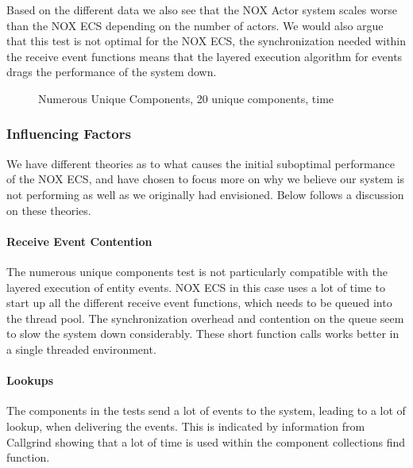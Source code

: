 Based on the different data we also see that the NOX Actor system scales worse than the NOX ECS depending on the number of actors.
We would also argue that this test is not optimal for the NOX ECS, the synchronization needed within the receive event functions
means that the layered execution algorithm for events drags the performance of the system down.

\begin{figure}[H]
\centering
{}
\caption[Numerous Components, ECS versus Actor, 20 Unique Components]{Numerous Unique Components, 20 unique components, time}
\label{fig:benchmarking_numerous_unique_20_time}
\end{figure}

\subsubsection{Influencing Factors}
We have different theories as to what causes the initial suboptimal performance of the NOX ECS,
and have chosen to focus more on why we believe our system is not performing as well as we originally had envisioned.
Below follows a discussion on these theories.

\paragraph{Receive Event Contention}
The numerous unique components test is not particularly compatible with the layered execution of entity events.
NOX ECS in this case uses a lot of time to start up all the different receive event functions, which needs
to be queued into the thread pool.
The synchronization overhead and contention on the queue seem to slow the system down considerably.
These short function calls works better in a single threaded environment.

\paragraph{Lookups}
The components in the tests send a lot of events to the system, leading to a lot of lookup,
when delivering the events.
This is indicated by information from Callgrind showing that a lot of time is used within the component collections find function.

